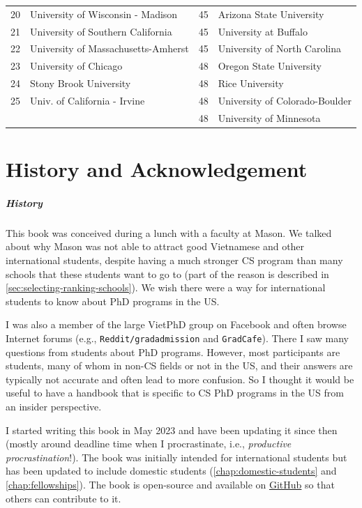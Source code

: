 \documentclass[oneside,11pt,dvipsnames]{book}
\newcommand{\red}[1]{{\color{red}{#1}}}
\begin{document}
\begin{table}
\begin{tabular}{rl|rl}
    20 &  University of Wisconsin - Madison\red{$^*$}  &45& Arizona State University\red{$^*$} \\
    21 &  University of Southern California &45& University at Buffalo\red{$^*$} \\
    22 & University of Massachusetts-Amherst\red{$^*$} &45& University of North Carolina\red{$^*$} \\
    23 & University of Chicago &48& Oregon State University\red{$^*$}\\
    24 & Stony Brook University\red{$^*$} &48& Rice University\\
    25 &  Univ. of California - Irvine&48& University of Colorado-Boulder \\
    & &48& University of Minnesota\\ 
    \bottomrule
  \end{tabular}
\end{table}

\chapter{History and Acknowledgement}\label{chap:ack}
\paragraph{History} This book was conceived during a lunch with a faculty at Mason.  We talked about why Mason was not able to attract good Vietnamese and other international students, despite having a much stronger CS program than many schools that these students want to go to (part of the reason is described in \autoref{sec:selecting-ranking-schools}). We wish there were a way for international students to know about PhD programs in the US.

I was also a member of the large VietPhD group on Facebook and often browse Internet forums (e.g., \texttt{Reddit/gradadmission} and \texttt{GradCafe}). There I saw many questions from students about PhD programs.  However, most participants are students, many of whom in non-CS fields or not in the US, and their answers are typically not accurate and often lead to more confusion. So I thought it would be useful to have a handbook that is specific to CS PhD programs in the US from an insider perspective.

I started writing this book in May 2023 and have been updating it since then (mostly around deadline time when I procrastinate, i.e., \emph{productive procrastination}!). The book was initially intended for international students but has been updated to include domestic students (\autoref{chap:domestic-students} and \autoref{chap:fellowships}).
The book is open-source and available on \href{https://github.com/nguyenthanhvuh/phd-cs-us}{GitHub} so that others can contribute to it.
\end{document}
